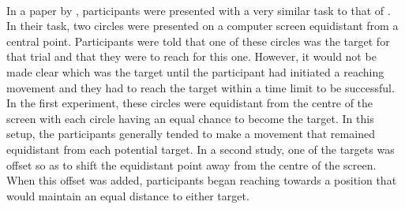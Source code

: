 \documentclass[12pt]{article}
\begin{document}

\paragraph{} In a paper by \cite{CHAPMAN2010168}, participants were presented with a very similar task to that of \cite{clarke2015failure}. In their task, two circles were presented on a computer screen equidistant from a central point. Participants were told that one of these circles was the target for that trial and that they were to reach for this one. However, it would not be made clear which was the target until the participant had initiated a reaching movement and they had to reach the target within a time limit to be successful. In the first experiment, these circles were equidistant from the centre of the screen with each circle having an equal chance to become the target. In this setup, the participants generally tended to make a movement that remained equidistant from each potential target. In a second study, one of the targets was offset so as to shift the equidistant point away from the centre of the screen. When this offset was added, participants began reaching towards a position that would maintain an equal distance to either target.
\end{document}
